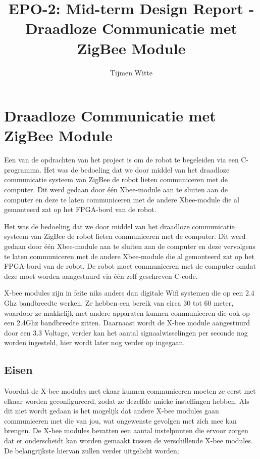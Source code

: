 \documentclass{report}
\title{EPO-2: Mid-term Design Report - Draadloze Communicatie met ZigBee Module}
\author{Tijmen Witte}
\begin{document}
\chapter{Draadloze Communicatie met ZigBee Module}

Een van de opdrachten van het project is om de robot te begeleiden via een C-programma. Het was de bedoeling dat we door middel van het draadloze communicatie systeem van ZigBee de robot lieten communiceren met de computer. Dit werd gedaan door één Xbee-module aan te sluiten aan de computer en deze te laten communiceren met de andere Xbee-module die al gemonteerd zat op het FPGA-bord van de robot.
\newline

Het was de bedoeling dat we door middel van het draadloze communicatie systeem van ZigBee de robot lieten communiceren met de computer. Dit werd gedaan door één Xbee-module aan te sluiten aan de computer en deze vervolgens te laten communiceren met de andere Xbee-module die al gemonteerd zat op het FPGA-bord van de robot. De robot moet communiceren met de computer omdat deze moet worden aangestuurd via één zelf geschreven C-code.
\newline

X-bee modules zijn in feite niks anders dan digitale Wifi systemen die op een 2.4 Ghz bandbreedte werken. Ze hebben een bereik van circa 30 tot 60 meter, waardoor ze makkelijk met andere apparaten kunnen communiceren die ook op een 2.4Ghz bandbreedte zitten. Daarnaast wordt de X-bee module aangestuurd door een 3.3 Voltage, verder kan het aantal signaalwisselingen per seconde nog worden ingesteld, hier wordt later nog verder op ingegaan.
\newline

\section{Eisen}

Voordat de X-bee modules met ekaar kunnen communiceren moeten ze eerst met elkaar worden geconfigureerd, zodat ze dezelfde unieke instellingen hebben. Als dit niet wordt gedaan is het mogelijk dat andere X-bee modules gaan communiceren met die van jou, wat ongewenste gevolgen met zich mee kan brengen. 
\newline
De X-bee modules bevatten een aantal instelpunten die ervoor zorgen dat er onderscheidt kan worden gemaakt tussen de verschillende X-bee modules. De belangrijkste hiervan zullen verder uitgelicht worden;
\newline
\end{document}
